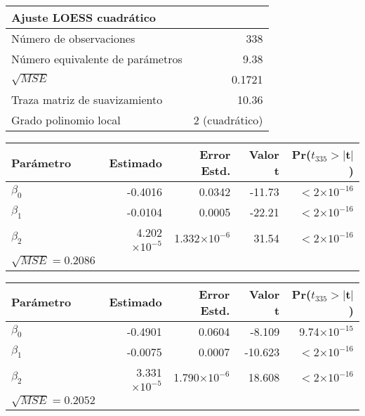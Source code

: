 \documentclass[11pt]{article}
\begin{document}
\begin{table}[ht]
\centering
\begin{tabular}{lr}
 Ajuste LOESS cuadrático & \\ 
 \hline
 Número de observaciones & 338 \\
 Número equivalente de parámetros & 9.38 \\
 $\sqrt{MSE}$ & 0.1721 \\
 Traza matriz de suavizamiento & 10.36\\
Grado polinomio local & 2 (cuadrático)\\
   \hline
\end{tabular}
\end{table}

\begin{table}[ht]
\centering
\begin{tabular}{lrrrr}

 Parámetro & Estimado & Error Estd. & Valor t & Pr($t_{335}>$$|$t$|$) \\ 
  \hline
$\beta_0$ & -0.4016 & 0.0342 & -11.73 & $<$2$\times10^{-16}$ \\ 
  $\beta_1$ & -0.0104 & 0.0005 & -22.21 & $<$2$\times10^{-16}$ \\ 
  $\beta_2$ & 4.202$\times10^{-5}$ & 1.332$\times10^{-6}$ & 31.54 & $<$2$\times10^{-16}$ \\ 
   \hline
   $\sqrt{MSE}=0.2086$\\
   \hline
\end{tabular}
\end{table}

\begin{table}[ht]
\centering
\begin{tabular}{lrrrr}

 Parámetro & Estimado & Error Estd. & Valor t & Pr($t_{335}>$$|$t$|$) \\ 
  \hline
$\beta_0$ & -0.4901 & 0.0604 & -8.109 & 9.74$\times10^{-15}$ \\ 
  $\beta_1$ & -0.0075 & 0.0007 & -10.623 & $<$2$\times10^{-16}$ \\ 
  $\beta_2$ & 3.331$\times10^{-5}$ & 1.790$\times10^{-6}$ & 18.608 & $<$2$\times10^{-16}$ \\ 
   \hline
   $\sqrt{MSE}=0.2052$\\
   \hline
\end{tabular}
\end{table}
\end{document}
